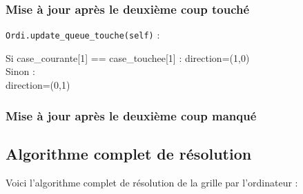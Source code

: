 \subsubsection{Mise à jour après le deuxième coup touché}
\texttt{Ordi.update\_queue\_touche(self)} :
\begin{algo1}
Si case\_courante[1] == case\_touchee[1] :
direction=(1,0)\\
Sinon :\\
direction=(0,1)\\
\end{algo1}


\subsubsection{Mise à jour après le deuxième coup manqué}

\subsection{Algorithme complet de résolution}
Voici l'algorithme complet de résolution de la grille par l'ordinateur :


